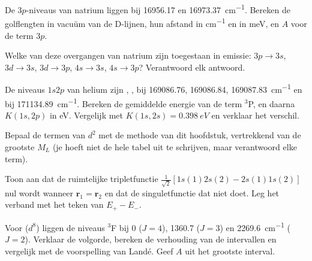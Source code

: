 \begin{exercise}[$\star\star$]\label{exo:b3:many-electron-atoms:6}
De $3p$-niveaus van natrium liggen bij 16956.17 en \qty{16973.37}{cm^{-1}}. Bereken
de golflengten in vacuüm van de D-lijnen, hun afstand in \unit{cm^{-1}} en
in meV, en $A$ voor de term $3p$.
\end{exercise}

\begin{exercise}[$\star\star$]\label{exo:b3:many-electron-atoms:7}
Welke van deze overgangen van natrium zijn toegestaan in emissie: $3p \to 3s$,
$3d \to 3s$, $3d \to 3p$, $4s \to 3s$, $4s \to 3p$? Verantwoord elk antwoord.
\end{exercise}

\begin{exercise}[$\star\star$]\label{exo:b3:many-electron-atoms:8}
De niveaus $1s2p$ van helium zijn , ,
 bij 169086.76, 169086.84, \qty{169087.83}{cm^{-1}} en
 bij \qty{171134.89}{cm^{-1}}. Bereken de gemiddelde energie
van de term ${}^3$P, en daarna $K(1s,2p)$ in eV. Vergelijk met $K(1s,2s) = \qty{0.398}{eV}$
en verklaar het verschil.
\end{exercise}

\begin{exercise}[$\star\star$]\label{exo:b3:many-electron-atoms:9}
Bepaal de termen van $d^2$ met de methode van dit hoofdstuk, vertrekkend
van de grootste $M_L$ (je hoeft niet de hele tabel uit te schrijven, maar
verantwoord elke term).
\end{exercise}

\begin{exercise}[$\star\star\star$]\label{exo:b3:many-electron-atoms:10}
Toon aan dat de ruimtelijke tripletfunctie $\frac{1}{\sqrt2}[1s(1)2s(2) -
2s(1)1s(2)]$ nul wordt wanneer $\mathbf r_1 = \mathbf r_2$ en dat de
singuletfunctie dat niet doet. Leg het verband met het teken van $E_+ - E_-$.
\end{exercise}

\begin{exercise}[$\star\star\star$]\label{exo:b3:many-electron-atoms:11}
Voor  ($d^8$) liggen de niveaus ${}^3$F bij 0 ($J = 4$), 1360.7 ($J = 3$)
en \qty{2269.6}{cm^{-1}} ($J = 2$). Verklaar de volgorde, bereken de
verhouding van de intervallen en vergelijk met de voorspelling van Landé.
Geef $A$ uit het grootste interval.
\end{exercise}

